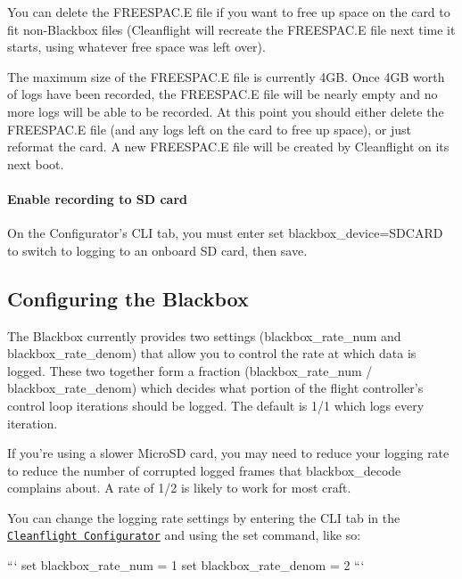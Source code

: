 You can delete the F\+R\+E\+E\+S\+P\+A\+C.\+E file if you want to free up space on the card to fit non-\/\+Blackbox files (Cleanflight will recreate the F\+R\+E\+E\+S\+P\+A\+C.\+E file next time it starts, using whatever free space was left over).

The maximum size of the F\+R\+E\+E\+S\+P\+A\+C.\+E file is currently 4\+G\+B. Once 4\+G\+B worth of logs have been recorded, the F\+R\+E\+E\+S\+P\+A\+C.\+E file will be nearly empty and no more logs will be able to be recorded. At this point you should either delete the F\+R\+E\+E\+S\+P\+A\+C.\+E file (and any logs left on the card to free up space), or just reformat the card. A new F\+R\+E\+E\+S\+P\+A\+C.\+E file will be created by Cleanflight on its next boot.

\paragraph*{Enable recording to S\+D card}

On the Configurator's C\+L\+I tab, you must enter {\ttfamily set blackbox\+\_\+device=S\+D\+C\+A\+R\+D} to switch to logging to an onboard S\+D card, then save.

\subsection*{Configuring the Blackbox}

The Blackbox currently provides two settings ({\ttfamily blackbox\+\_\+rate\+\_\+num} and {\ttfamily blackbox\+\_\+rate\+\_\+denom}) that allow you to control the rate at which data is logged. These two together form a fraction ({\ttfamily blackbox\+\_\+rate\+\_\+num / blackbox\+\_\+rate\+\_\+denom}) which decides what portion of the flight controller's control loop iterations should be logged. The default is 1/1 which logs every iteration.

If you're using a slower Micro\+S\+D card, you may need to reduce your logging rate to reduce the number of corrupted logged frames that {\ttfamily blackbox\+\_\+decode} complains about. A rate of 1/2 is likely to work for most craft.

You can change the logging rate settings by entering the C\+L\+I tab in the \href{https://chrome.google.com/webstore/detail/cleanflight-configurator/enacoimjcgeinfnnnpajinjgmkahmfgb?hl=en}{\tt Cleanflight Configurator} and using the {\ttfamily set} command, like so\+:

``` set blackbox\+\_\+rate\+\_\+num = 1 set blackbox\+\_\+rate\+\_\+denom = 2 ```

